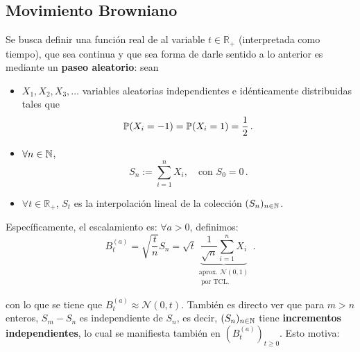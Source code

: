 % 

\subsection{Movimiento Browniano}


Se busca definir una función real de al variable $t \in \mathbb{R}_{+}$ (interpretada como tiempo), que sea continua y que sea \textit{} forma de darle sentido a lo anterior es mediante un \textbf{paseo aleatorio}: sean 
\begin{itemize}
\item $X_1, X_2, X_3, \ldots $ variables aleatorias independientes e idénticamente distribuidas tales que 
    \begin{equation*}
            \P(X_{i} = -1) = \P(X_i = 1) = \frac{1}{2}\,.
    \end{equation*}
 \item $\forall  n \in \N$,
     \begin{equation*}
             S_n := \sum_{i=1}^{n} X_i, ~ ~ ~ \text{ con } S_0 = 0\,.
     \end{equation*}
 \item $\forall t\in \mathbb{R}_{+}$, $S_t$ es la interpolación lineal de la colección $(S_{n})_{n \in \N}$.
\end{itemize}

Específicamente, el escalamiento es: $\forall a >0$, definimos:
\begin{equation*}
    B_t^{(a)} = \sqrt{\frac{t}{n}}   S_n = \sqrt{t}
    \underbrace{\frac{1}{\sqrt{n} } \sum_{i=1}^{n} X_i}_{\substack{\text{aprox. } \mathcal{N}(0,1) \\ \text{ por TCL.}}}\,.
\end{equation*}

con lo que se tiene que $B_t^{(a)} \approx \mathcal{N}(0,t)$. También es directo ver que para $m > n$ enteros, $S_m - S_n$ es independiente de $S_n$, es decir, $(S_n)_{n \in \N}$ tiene \textbf{incrementos independientes}, lo cual se manifiesta también en $(B_{t}^{(a)})_{t \geq 0}$. Esto motiva:

